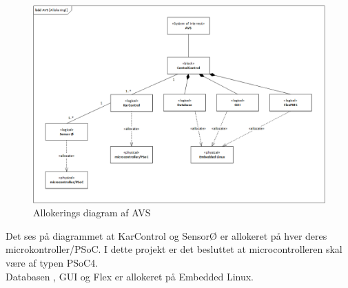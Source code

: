 \begin{figure}[H]
	\centering
	\includegraphics[width=1\textwidth]{Projektbeskrivelse/Systemarkitektur/photo/System_Allokeringsdiagram}
	\caption{Allokerings diagram af AVS}
	\label{fig:System_BDD}
\end{figure} 
Det ses på diagrammet at KarControl og SensorØ er allokeret på hver deres microkontroller/PSoC. I dette projekt er det besluttet at microcontrolleren skal
være af typen PSoC4.  \\
Databasen , GUI og Flex er allokeret på Embedded Linux. 
